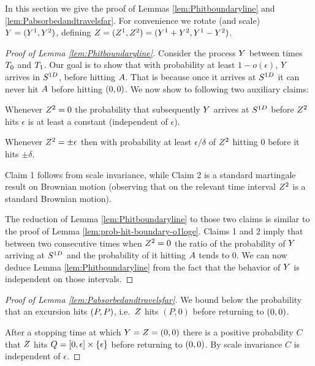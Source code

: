 {In this section we give the proof of Lemmas \ref{lem:Phitboundaryline}
and \ref{lem:Pabsorbedandtravelsfar}.
For convenience we rotate (and scale) $Y=(Y^1,Y^2)$, defining
$Z=(Z^1,Z^2)=(Y^1+Y^2,Y^1-Y^2)$.

\begin{proof}[Proof of Lemma \ref{lem:Phitboundaryline}]
Consider the process $Y$ between times $T_0$ and $T_1$.
Our goal is to show that with probability at least $1-o(\epsilon)$, $Y$ arrives in
$S^{1D}$, before hitting $A$. That is because once it arrives at
$S^{1D}$ it can never hit $A$ before hitting $(0,0)$.
We now show to following two
auxiliary claims:

\begin{claim}
 Whenever $Z^2=0$ the probability that subsequently $Y$ arrives at $S^{1D}$ before $Z^2$ hits $\epsilon$ is at least a constant (independent of $\epsilon$).
\end{claim}

\begin{claim}
Whenever $Z^2=\pm\epsilon$ then with probability at least $\epsilon/\delta$ of $Z^2$ hitting $0$ before it hits $\pm\delta$.
\end{claim}

Claim 1 follows from scale invariance, while Claim 2 is a standard martingale result on Brownian motion (observing that on the relevant time interval $Z^2$ is a standard Brownian motion).

The reduction of Lemma \ref{lem:Phitboundaryline} to those two claims is similar to the
proof of Lemma \ref{lem:prob-hit-boundary-o1loge}. Claims 1 and 2 imply that between two consecutive times when $Z^2=0$
the ratio of the probability of $Y$ arriving at $S^{1D}$ and the probability
of it hitting $A$ tends to $0$. We can now deduce Lemma \ref{lem:Phitboundaryline} from the fact that the behavior of $Y$ is independent on those intervals.
\end{proof}

\begin{proof}[Proof of Lemma \ref{lem:Pabsorbedandtravelsfar}]
We bound below the probability that an excursion hits $(P,P)$,
i.e.\ $Z$ hits $(P,0)$ before returning to $(0,0)$.

After a stopping time at which $Y = Z = (0,0)$ there is a positive probability $C$
that $Z$ hits $Q=[0, \epsilon] \times
\{\epsilon\}$ before returning to $(0,0)$.
By scale invariance $C$ is independent of $\epsilon$.


\end{proof}}
